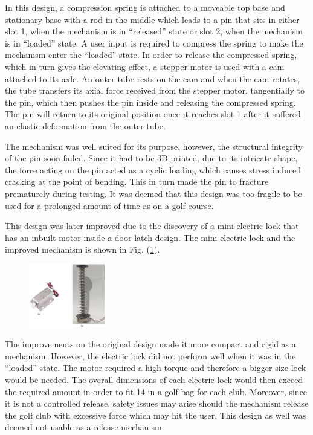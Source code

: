 \documentclass[11pt,landscape]{article}
\begin{document}
\begin{multicols}{3}
In this design, a compression spring is attached to a moveable top base and
stationary base with a rod in the middle which leads to a pin that sits in
either slot 1, when the mechanism is in “released” state or slot 2, when the
mechanism is in “loaded” state. A user input is required to compress the spring
to make the mechanism enter the “loaded” state. In order to release the
compressed spring, which in turn gives the elevating effect, a stepper motor is
used with a cam attached to its axle. An outer tube rests on the cam and when
the cam rotates, the tube transfers its axial force received from the stepper
motor, tangentially to the pin, which then pushes the pin inside and releasing
the compressed spring. The pin will return to its original position once it
reaches slot 1 after it suffered an elastic deformation from the outer tube.

The mechanism was well suited for its purpose, however, the structural integrity
of the pin soon failed. Since it had to be 3D printed, due to its intricate
shape, the force acting on the pin acted as a cyclic loading which causes stress
induced cracking at the point of bending. This in turn made the pin to fracture
prematurely during testing. It was deemed that this design was too fragile to be
used for a prolonged amount of time as on a golf course.

This design was later improved due to the discovery of a mini electric lock that
has an inbuilt motor inside a door latch design. The mini electric lock and the
improved mechanism is shown in Fig. (\ref{fig:improv_release_mech}).

\begin{figure}[H]
    \begin{center}
        \includegraphics[width=0.3\textwidth]{Improv Release Mech.PNG}
        \label{fig:improv_release_mech}
    \end{center}
\end{figure}

The improvements on the original design made it more compact and rigid as a
mechanism. However, the electric lock did not perform well when it was in the
“loaded” state. The motor required a high torque and therefore a bigger size
lock would be needed. The overall dimensions of each electric lock would then
exceed the required amount in order to fit 14 in a golf bag for each club.
Moreover, since it is not a controlled release, safety issues may arise should
the mechanism release the golf club with excessive force which may hit the user.
This design as well was deemed not usable as a release mechanism.


\end{multicols}
\end{document}
